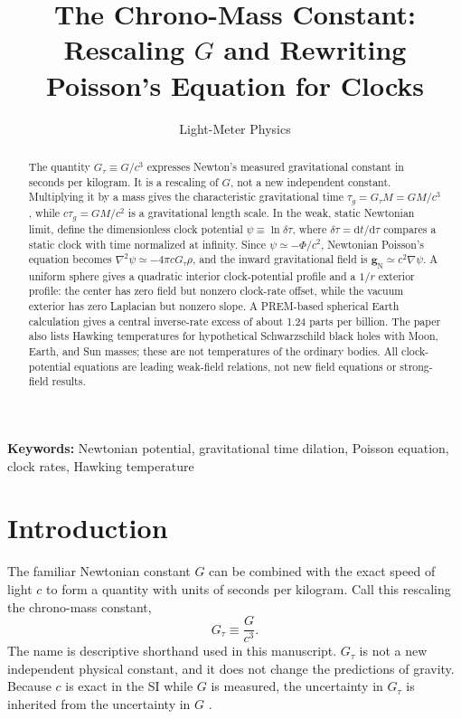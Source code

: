 \documentclass[12pt]{article}
\title{The Chrono-Mass Constant:\\
Rescaling $G$ and Rewriting Poisson's Equation for Clocks}
\author{Light-Meter Physics}
\date{}
\begin{document}
\maketitle

\begin{abstract}
The quantity $G_{\tau}\equiv G/c^3$ expresses Newton's measured gravitational constant in seconds per kilogram. It is a rescaling of $G$, not a new independent constant. Multiplying it by a mass gives the characteristic gravitational time $\tau_g=G_{\tau}M=GM/c^3$, while $c\tau_g=GM/c^2$ is a gravitational length scale. In the weak, static Newtonian limit, define the dimensionless clock potential $\psi\equiv\ln\delta\tau$, where $\delta\tau=\mathrm{d}t/\mathrm{d}\tau$ compares a static clock with time normalized at infinity. Since $\psi\simeq-\Phi/c^2$, Newtonian Poisson's equation becomes $\nabla^2\psi\simeq-4\pi cG_{\tau}\rho$, and the inward gravitational field is $\mathbf{g}_{\mathrm{N}}\simeq c^2\nabla\psi$. A uniform sphere gives a quadratic interior clock-potential profile and a $1/r$ exterior profile: the center has zero field but nonzero clock-rate offset, while the vacuum exterior has zero Laplacian but nonzero slope. A PREM-based spherical Earth calculation gives a central inverse-rate excess of about 1.24 parts per billion. The paper also lists Hawking temperatures for hypothetical Schwarzschild black holes with Moon, Earth, and Sun masses; these are not temperatures of the ordinary bodies. All clock-potential equations are leading weak-field relations, not new field equations or strong-field results.
\end{abstract}

\noindent\textbf{Keywords:} Newtonian potential, gravitational time dilation, Poisson equation, clock rates, Hawking temperature

\section{Introduction}

The familiar Newtonian constant $G$ can be combined with the exact speed of light $c$ to form a quantity with units of seconds per kilogram. Call this rescaling the chrono-mass constant,
\begin{equation}
  G_{\tau}\equiv\frac{G}{c^3}.
  \label{eq:chrono-mass-constant}
\end{equation}
The name is descriptive shorthand used in this manuscript. $G_{\tau}$ is not a new independent physical constant, and it does not change the predictions of gravity. Because $c$ is exact in the SI while $G$ is measured, the uncertainty in $G_{\tau}$ is inherited from the uncertainty in $G$ \cite{CODATA2022}.
\end{document}
